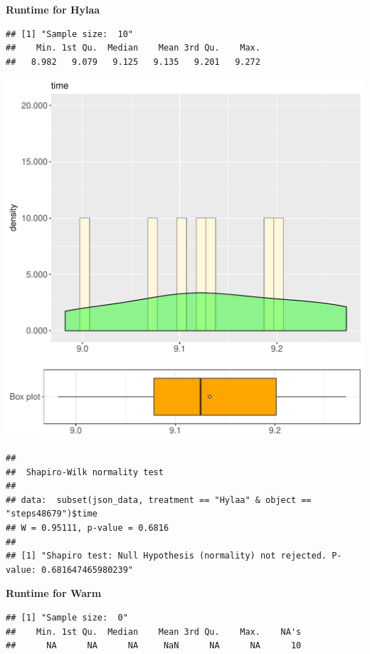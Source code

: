 \documentclass{article}\usepackage[]{graphicx}\usepackage[]{color}
\makeatletter
\def\maxwidth{ %
  \ifdim\Gin@nat@width>\linewidth
    \linewidth
  \else
    \Gin@nat@width
  \fi
}
\newenvironment{kframe}{%
 \def\at@end@of@kframe{}%
 \ifinner\ifhmode%
  \def\at@end@of@kframe{\end{minipage}}%
  \begin{minipage}{\columnwidth}%
 \fi\fi%
 \def\FrameCommand##1{\hskip\@totalleftmargin \hskip-\fboxsep
 \colorbox{shadecolor}{##1}\hskip-\fboxsep
     \hskip-\linewidth \hskip-\@totalleftmargin \hskip\columnwidth}%
 \MakeFramed {\advance\hsize-\width
   \@totalleftmargin\z@ \linewidth\hsize
   \@setminipage}}%
 {\par\unskip\endMakeFramed%
 \at@end@of@kframe}
\newenvironment{knitrout}{}{} %
\makeatother
\begin{document}
 \textbf{Runtime for Hylaa}
\begin{knitrout}
\color{fgcolor}\begin{kframe}
\begin{verbatim}
## [1] "Sample size:  10"
##    Min. 1st Qu.  Median    Mean 3rd Qu.    Max. 
##   8.982   9.079   9.125   9.135   9.201   9.272
\end{verbatim}
\end{kframe}
\includegraphics[width=\maxwidth]{figure/RH1_Hylaa_steps48679-1} 
\begin{kframe}\begin{verbatim}
## 
## 	Shapiro-Wilk normality test
## 
## data:  subset(json_data, treatment == "Hylaa" & object == "steps48679")$time
## W = 0.95111, p-value = 0.6816
## 
## [1] "Shapiro test: Null Hypothesis (normality) not rejected. P-value: 0.681647465980239"
\end{verbatim}
\end{kframe}
\end{knitrout}
 \textbf{Runtime for Warm}
\begin{knitrout}
\color{fgcolor}\begin{kframe}
\begin{verbatim}
## [1] "Sample size:  0"
##    Min. 1st Qu.  Median    Mean 3rd Qu.    Max.    NA's 
##      NA      NA      NA     NaN      NA      NA      10
\end{verbatim}
\end{kframe}
\end{knitrout}
  
\end{document}
